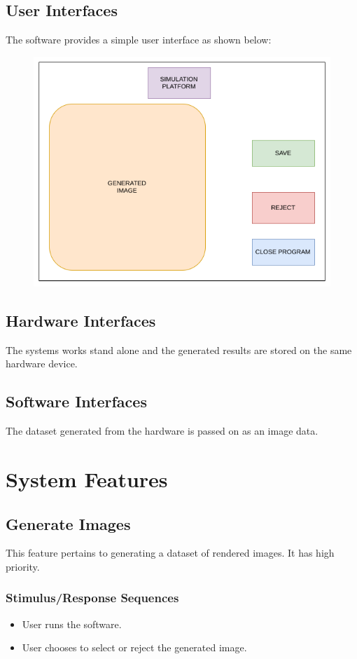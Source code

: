 \documentclass[a4paper,12pt]{article}
\begin{document}
\subsection{User Interfaces}
The software provides a simple user interface as shown below:
\begin{figure}[H]
\includegraphics[scale=0.75]{gui.png}
\end{figure}
\subsection{Hardware Interfaces}
The systems works stand alone and the generated results are stored on the same hardware device.
\subsection{Software Interfaces}
The dataset generated from the hardware is passed on as an image data. 

\newpage
\section{System Features}
\subsection{Generate Images}
This feature pertains to generating a dataset of rendered images. It has high priority.


\subsubsection{Stimulus/Response Sequences}
\begin{itemize}
\item User runs the software.
\item User chooses to select or reject the generated image.
\end{itemize}
\end{document}
